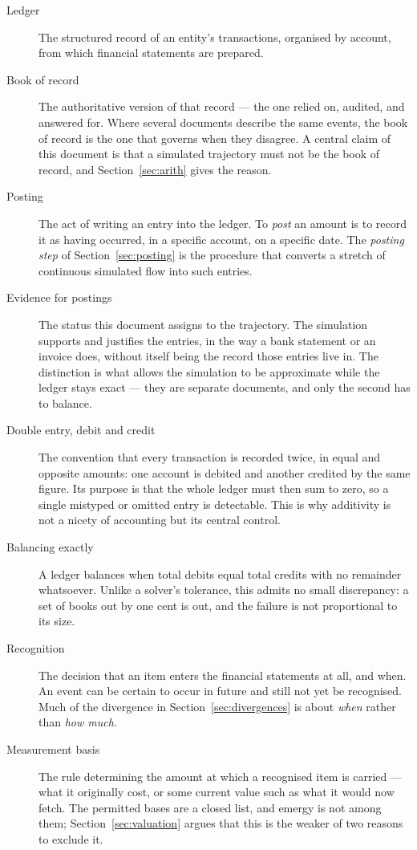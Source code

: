 \documentclass[11pt,a4paper]{article}
\begin{document}
\begin{description}
\item[Ledger] The structured record of an entity's transactions, organised by account, from which financial statements are prepared.
\item[Book of record] The authoritative version of that record --- the one relied on, audited, and answered for. Where several documents describe the same events, the book of record is the one that governs when they disagree. A central claim of this document is that a simulated trajectory must not be the book of record, and Section~\ref{sec:arith} gives the reason.
\item[Posting] The act of writing an entry into the ledger. To \emph{post} an amount is to record it as having occurred, in a specific account, on a specific date. The \emph{posting step} of Section~\ref{sec:posting} is the procedure that converts a stretch of continuous simulated flow into such entries.
\item[Evidence for postings] The status this document assigns to the trajectory. The simulation supports and justifies the entries, in the way a bank statement or an invoice does, without itself being the record those entries live in. The distinction is what allows the simulation to be approximate while the ledger stays exact --- they are separate documents, and only the second has to balance.
\item[Double entry, debit and credit] The convention that every transaction is recorded twice, in equal and opposite amounts: one account is debited and another credited by the same figure. Its purpose is that the whole ledger must then sum to zero, so a single mistyped or omitted entry is detectable. This is why additivity is not a nicety of accounting but its central control.
\item[Balancing exactly] A ledger balances when total debits equal total credits with no remainder whatsoever. Unlike a solver's tolerance, this admits no small discrepancy: a set of books out by one cent is out, and the failure is not proportional to its size.
\item[Recognition] The decision that an item enters the financial statements at all, and when. An event can be certain to occur in future and still not yet be recognised. Much of the divergence in Section~\ref{sec:divergences} is about \emph{when} rather than \emph{how much}.
\item[Measurement basis] The rule determining the amount at which a recognised item is carried --- what it originally cost, or some current value such as what it would now fetch. The permitted bases are a closed list, and emergy is not among them; Section~\ref{sec:valuation} argues that this is the weaker of two reasons to exclude it.

\end{description}
\end{document}
